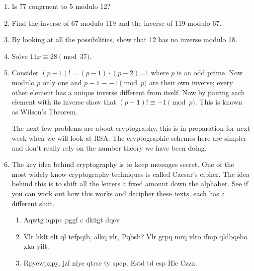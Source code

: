 \documentclass[12pt]{article}
\begin{document}
\begin{enumerate}
\item Is 77 congruent to 5 modulo 12?

\item Find the inverse of 67 modulo 119 and the inverse of 119 modulo 67.

\item By looking at all the possibilities, show that 12 has no inverse modulo 18.

\item Solve $11x\equiv 28 \pmod {37}$.

\item Consider $(p-1)!=(p-1)\cdot (p-2)\ldots 1$ where $p$ is an odd
  prime. Now modulo $p$ only one and $p-1\equiv -1\pmod p$ are their
  own inverse; every other element has a unique inverse different from
  itself. Now by pairing each element with its inverse show that
  $(p-1)!\equiv -1 \pmod p$. This is known as Wilson's Theorem.

The next few problems are about cryptography, this is in preparation
for next week when we will look at RSA. The cryptographic schemes here
are simpler and don't really rely on the number theory we have been
doing.

\item The key idea behind cryptography is to keep messages secret. One
  of the most widely know cryptography techniques is called Caesar's
  cipher. The idea behind this is to shift all the letters a fixed
  amount down the alphabet. See if you can work out how this works and
  decipher these texts, each has a different shift.
\begin{enumerate}
\item Aqwtg iqppc pggf c dkiigt dqcv
\item Vlr hklt elt ql tefpqib, alkq vlr, Pqbsb? Vlr grpq mrq vlro ifmp qldbqebo xka yilt.
\item Rpyewpxpy, jzf nlye qtrse ty spcp. Estd td esp Hlc Czzx.
\end{enumerate}


\end{enumerate}
\end{document}
